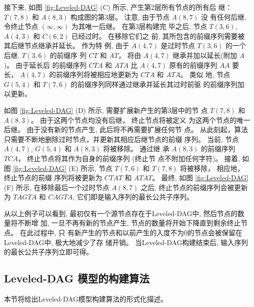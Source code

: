 接下来, 如图 \ref{fig:Leveled-DAG} (C) 所示, 产生第2层所有节点的所有后
继：$T(7, 8)$ 和 $A(8, 3)$ 构成图的第3层。 注意, 由于节点 $A(8, 7)$ 没
有任何后继, 令终止节点 $(\infty, \infty)$ 为其唯一后继。 在第3层构建完
毕之后, 节点 $T(3, 6)$, $A(4, 3)$ 和 $C(6, 2)$ 已经过时。 在移除它们之
前, 其所包含的前缀序列需要被其后继节点继承并延长。 作为特
例, 由于 $A(4, 7)$ 是过时节点 $T(3, 6)$ 的一个后继, $T(3, 6)$ 的前缀序
列 $CT$ 和 $AT$， 将由 $A(4, 7)$ 继承并加以延长(附加 $A$)。 由于延长后
的前缀序列 $CTA$ 和 $ATA$ 比 $A(4, 7)$ 原有的前缀序列 $AA$ 要
长， $A(4, 7)$ 的前缀序列将被相应地更新为 $CTA$ 和 $ATA$。 类似
地, 节点 $G(5, 4)$ 和 $T(7, 6)$ 的前缀序列同样通过继承并延长其过时前驱
的前缀序列加以更新。

如图 \ref{fig:Leveled-DAG} (D) 所示, 需要扩展新产生的第3层中的节
点 $T(7, 8)$ 和 $A(8, 3)$。 由于这两个节点均没有后继， 终止节点将被定义
为这两个节点的唯一后继。 由于没有新的节点产生, 此后将不再需要扩展任何节
点。 从此刻起，算法只需要不断地删除过时节点，并更新其相应后继节点的前缀
序列。 当前, 节点 $A(4, 7)$, $G(5, 4)$ 和 $A(8, 3)$ 将被移除。 通过继
承 $A(8, 3)$ 的前缀序列 $TCA$， 终止节点将其作为自身的前缀序列 (终止节
点不附加任何字符)。 接着, 如图 \ref{fig:Leveled-DAG}
(E) 所示, 节点 $T(7, 6)$ 和 $T(7, 8)$ 将被移除， 相应地，终止节点的前缀
序列将被更新为 $CTAT$ 和 $ATAT$。 最终, 如图 \ref{fig:Leveled-DAG} (F)
所示, 在移除最后一个过时节点 $A(8, 7)$ 之后, 终止节点的前缀序列会被更新
为 $TAGTA$ 和 $CAGTA$, 它们即是输入序列的最长公共子序列。

从以上例子可以看到, 最初仅有一个源节点存在于Leveled-DAG中, 然后节点的数量将不断增
加, 一旦不再有新的节点产生, 节点的数量将开始下降直到剩余终止节点。 在此过程中, 只
有新产生的节点和以前产生的入度不为0的节点会被保留在Leveled-DAG中, 极大地减少了存
储开销。 当Leveled-DAG构建结束后, 输入序列的最长公共子序列立即可得。

\subsection{Leveled-DAG 模型的构建算法 }
\label{sec:PMA}

本节将给出Leveled-DAG模型构建算法的形式化描述。\\

